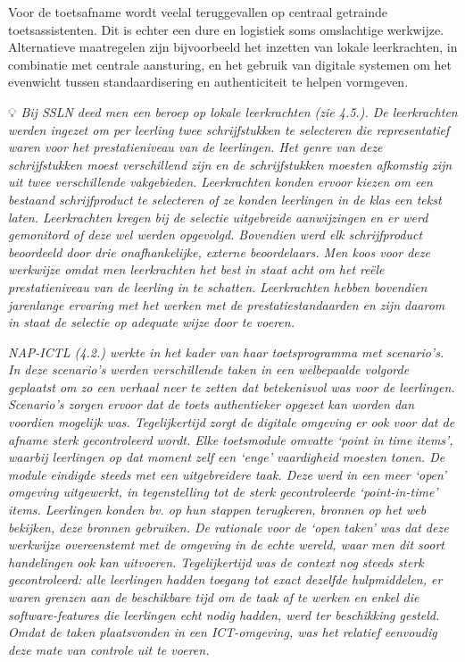 \documentclass[
  letterpaper,
]{report}
\begin{document}
Voor de toetsafname wordt veelal teruggevallen op centraal getrainde
toetsassistenten. Dit is echter een dure en logistiek soms omslachtige
werkwijze. Alternatieve maatregelen zijn bijvoorbeeld het inzetten van
lokale leerkrachten, in combinatie met centrale aansturing, en het
gebruik van digitale systemen om het evenwicht tussen standaardisering
en authenticiteit te helpen vormgeven.

💡 \emph{Bij SSLN deed men een beroep op lokale leerkrachten (zie 4.5.).
De leerkrachten werden ingezet om per leerling twee schrijfstukken te
selecteren die representatief waren voor het prestatieniveau van de
leerlingen. Het genre van deze schrijfstukken moest verschillend zijn en
de schrijfstukken moesten afkomstig zijn uit twee verschillende
vakgebieden. Leerkrachten konden ervoor kiezen om een bestaand
schrijfproduct te selecteren of ze konden leerlingen in de klas een
tekst laten. Leerkrachten kregen bij de selectie uitgebreide
aanwijzingen en er werd gemonitord of deze wel werden opgevolgd.
Bovendien werd elk schrijfproduct beoordeeld door drie onafhankelijke,
externe beoordelaars. Men koos voor deze werkwijze omdat men
leerkrachten het best in staat acht om het reële prestatieniveau van de
leerling in te schatten. Leerkrachten hebben bovendien jarenlange
ervaring met het werken met de prestatiestandaarden en zijn daarom in
staat de selectie op adequate wijze door te voeren.}

\emph{NAP-ICTL (4.2.) werkte in het kader van haar toetsprogramma met
scenario's. In deze scenario's werden verschillende taken in een
welbepaalde volgorde geplaatst om zo een verhaal neer te zetten dat
betekenisvol was voor de leerlingen. Scenario's zorgen ervoor dat de
toets authentieker opgezet kan worden dan voordien mogelijk was.
Tegelijkertijd zorgt de digitale omgeving er ook voor dat de afname
sterk gecontroleerd wordt. Elke toetsmodule omvatte `point in time
items', waarbij leerlingen op dat moment zelf een `enge' vaardigheid
moesten tonen. De module eindigde steeds met een uitgebreidere taak.
Deze werd in een meer `open' omgeving uitgewerkt, in tegenstelling tot
de sterk gecontroleerde `point-in-time' items. Leerlingen konden bv. op
hun stappen terugkeren, bronnen op het web bekijken, deze bronnen
gebruiken. De rationale voor de `open taken' was dat deze werkwijze
overeenstemt met de omgeving in de echte wereld, waar men dit soort
handelingen ook kan uitvoeren. Tegelijkertijd was de context nog steeds
sterk gecontroleerd: alle leerlingen hadden toegang tot exact dezelfde
hulpmiddelen, er waren grenzen aan de beschikbare tijd om de taak af te
werken en enkel die software-features die leerlingen echt nodig hadden,
werd ter beschikking gesteld. Omdat de taken plaatsvonden in een
ICT-omgeving, was het relatief eenvoudig deze mate van controle uit te
voeren.}
\end{document}

